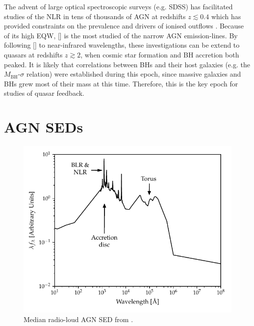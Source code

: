 The advent of large optical spectroscopic surveys (e.g. SDSS) has facilitated studies of the NLR in tens of thousands of AGN at redshifts $z\lesssim0.4$ which has provided constraints on the prevalence and drivers of ionised outflows \citep[e.g.][]{mullaney13,zakamska14}.
Because of its high EQW, [] is the most studied of the narrow AGN emission-lines.
By following [] to near-infrared wavelengths, these investigations can be extend to quasars at redshifts $z\gtrsim2$, when cosmic star formation and BH accretion both peaked.
It is likely that correlations between BHs and their host galaxies (e.g. the $M_{\text{BH}}$-$\sigma$ relation) were established during this epoch, since massive galaxies and BHs grew most of their mass at this time.
Therefore, this is the key epoch for studies of quasar feedback.

\section{AGN SEDs}

\begin{figure}
  \centering
  \includegraphics[width=\textwidth]{figures/chapter01/shangsed.pdf}
  \caption[{Median radio-loud AGN SED.}]{Median radio-loud AGN SED from \citet{shang11}.}
  \label{fig:seyfert_sed}
\end{figure}

